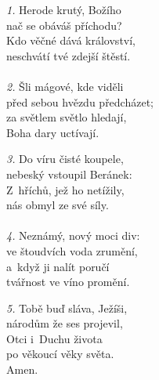 \begin{translatioMulticol}{3}
{\color{red}\textit{1.}} Herode krutý, Božího\\
nač se obáváš příchodu?\\
Kdo věčné dává království,\\
neschvátí tvé zdejší štěstí.\\
\\
{\color{red}\textit{2.}} Šli mágové, kde viděli\\
před sebou hvězdu předcházet;\\
za světlem světlo hledají,\\
Boha dary uctívají.\columnbreak

{\color{red}\textit{3.}} Do víru čisté koupele,\\
nebeský vstoupil Beránek:\\
Z~hříchů, jež ho netížily,\\
nás obmyl ze své síly.\\
\\
{\color{red}\textit{4.}} Neznámý, nový moci div:\\
ve štoudvích voda zrumění,\\
a~když ji nalít poručí\\
tvářnost ve víno promění.\columnbreak

{\color{red}\textit{5.}} Tobě buď sláva, Ježíši,\\
národům že ses projevil,\\
Otci i~Duchu života\\
po věkoucí věky světa.\\
Amen.
\end{translatioMulticol}
